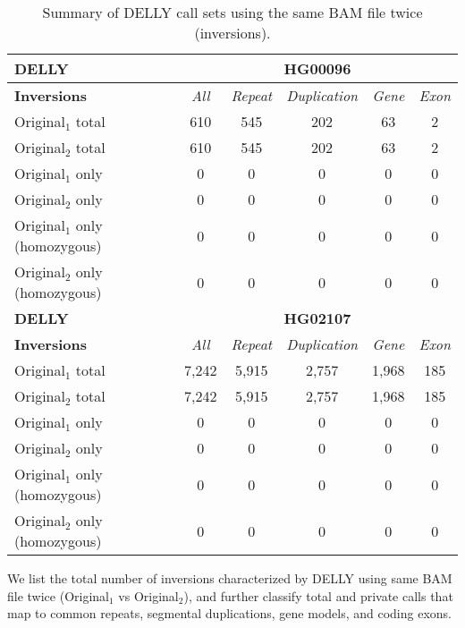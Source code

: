 \begin{table}[htb]
\caption{ Summary of DELLY call sets using the same BAM file twice (inversions). }
\begin{center}
\begin{tabular}{|l|c||c|c|c|c|}
\hline
{\bf DELLY} & \multicolumn{5}{|c|}{\bf HG00096} \\
\hline
\cline{2-6}
{\bf Inversions} & {\it All} & {\it Repeat} & {\it Duplication} & {\it Gene} & {\it Exon} \\
\hline
Original$_1$ total & 610 & 545 & 202 & 63 & 2\\ 
\hline
Original$_2$ total & 610 & 545 & 202 & 63 & 2\\ 
\hline
Original$_1$ only & 0 & 0 & 0 & 0 & 0\\ 
\hline
Original$_2$ only & 0 & 0 & 0 & 0 & 0\\ 
\hline
Original$_1$ only (homozygous) & 0 & 0 & 0 & 0 & 0\\ 
\hline
Original$_2$ only (homozygous) & 0 & 0 & 0 & 0 & 0\\ 
\hline
\hline
{\bf DELLY} & \multicolumn{5}{|c|}{\bf HG02107} \\
\hline
\cline{2-6}
{\bf Inversions} & {\it All} & {\it Repeat} & {\it Duplication} & {\it Gene} & {\it Exon} \\
\hline
Original$_1$ total & 7,242 & 5,915 & 2,757 & 1,968 & 185\\ 
\hline
Original$_2$ total & 7,242 & 5,915 & 2,757 & 1,968 & 185\\ 
\hline
Original$_1$ only & 0 & 0 & 0 & 0 & 0\\ 
\hline
Original$_2$ only & 0 & 0 & 0 & 0 & 0\\ 
\hline
Original$_1$ only (homozygous) & 0 & 0 & 0 & 0 & 0\\ 
\hline
Original$_2$ only (homozygous) & 0 & 0 & 0 & 0 & 0\\ 
\hline
\end{tabular}
\end{center}
{\footnotesize We list the total number of inversions characterized by DELLY using same BAM file twice (Original$_1$ vs Original$_2$), 
and further classify total and private calls that map to common repeats, segmental duplications, gene models, and coding exons.}
\label{supptab:orig-vs-orig2-delly-inv}
\end{table}

